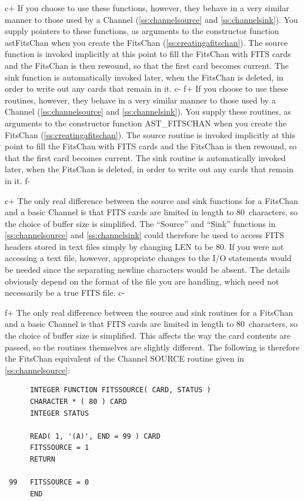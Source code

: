 \documentclass[twoside,11pt]{article}
\newcommand{\secref}[1]{\S\ref{#1}}
\renewcommand{\secref}[1]{\ref{#1}}
\begin{document}
c+
If you choose to use these functions, however, they behave in a very
similar manner to those used by a Channel (\secref{ss:channelsource}
and \secref{ss:channelsink}). You supply pointers to these functions,
as arguments to the constructor function astFitsChan when you create
the FitsChan (\secref{ss:creatingafitschan}). The source function is
invoked implicitly at this point to fill the FitsChan with FITS cards
and the FitsChan is then rewound, so that the first card becomes
current. The sink function is automatically invoked later, when the
FitsChan is deleted, in order to write out any cards that remain in
it.
c-
f+
If you choose to use these routines, however, they behave in a very
similar manner to those used by a Channel (\secref{ss:channelsource}
and \secref{ss:channelsink}). You supply these routines, as arguments
to the constructor function AST\_FITSCHAN when you create the FitsChan
(\secref{ss:creatingafitschan}). The source routine is invoked
implicitly at this point to fill the FitsChan with FITS cards and the
FitsChan is then rewound, so that the first card becomes current. The
sink routine is automatically invoked later, when the FitsChan is
deleted, in order to write out any cards that remain in it.
f-

c+
The only real difference between the source and sink functions for a
FitsChan and a basic Channel is that FITS cards are limited in length
to 80~characters, so the choice of buffer size is simplified.  The
``Source'' and ``Sink'' functions in \secref{ss:channelsource} and
\secref{ss:channelsink} could therefore be used to access FITS headers
stored in text files simply by changing LEN to be 80.  If you were not
accessing a text file, however, appropriate changes to the I/O
statements would be needed since the separating newline characters
would be absent. The details obviously depend on the format of the
file you are handling, which need not necessarily be a true FITS file.
c-

f+
The only real difference between the source and sink routines for a
FitsChan and a basic Channel is that FITS cards are limited in length
to 80~characters, so the choice of buffer size is simplified.  This
affects the way the card contents are passed, so the routines
themselves are slightly different.  The following is therefore the
FitsChan equivalent of the Channel SOURCE routine given in
\secref{ss:channelsource}:

\small
\begin{verbatim}
      INTEGER FUNCTION FITSSOURCE( CARD, STATUS )
      CHARACTER * ( 80 ) CARD
      INTEGER STATUS

      READ( 1, '(A)', END = 99 ) CARD
      FITSSOURCE = 1
      RETURN

 99   FITSSOURCE = 0
      END
\end{verbatim}
\normalsize
\end{document}
